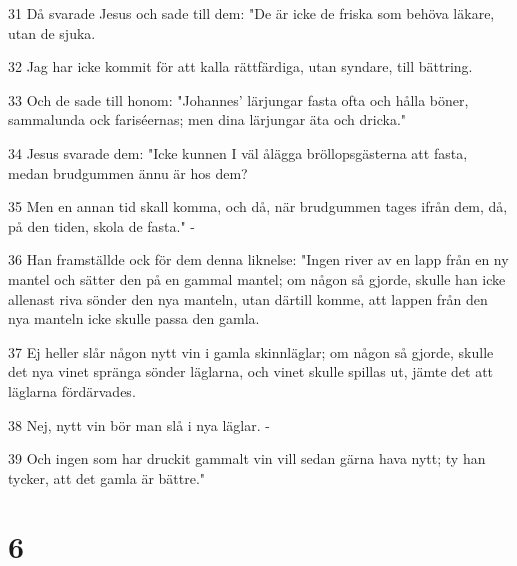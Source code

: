 \par 31 Då svarade Jesus och sade till dem: "De är icke de friska som behöva läkare, utan de sjuka.
\par 32 Jag har icke kommit för att kalla rättfärdiga, utan syndare, till bättring.
\par 33 Och de sade till honom: "Johannes' lärjungar fasta ofta och hålla böner, sammalunda ock fariséernas; men dina lärjungar äta och dricka."
\par 34 Jesus svarade dem: "Icke kunnen I väl ålägga bröllopsgästerna att fasta, medan brudgummen ännu är hos dem?
\par 35 Men en annan tid skall komma, och då, när brudgummen tages ifrån dem, då, på den tiden, skola de fasta." -
\par 36 Han framställde ock för dem denna liknelse: "Ingen river av en lapp från en ny mantel och sätter den på en gammal mantel; om någon så gjorde, skulle han icke allenast riva sönder den nya manteln, utan därtill komme, att lappen från den nya manteln icke skulle passa den gamla.
\par 37 Ej heller slår någon nytt vin i gamla skinnläglar; om någon så gjorde, skulle det nya vinet spränga sönder läglarna, och vinet skulle spillas ut, jämte det att läglarna fördärvades.
\par 38 Nej, nytt vin bör man slå i nya läglar. -
\par 39 Och ingen som har druckit gammalt vin vill sedan gärna hava nytt; ty han tycker, att det gamla är bättre."

\chapter{6}

